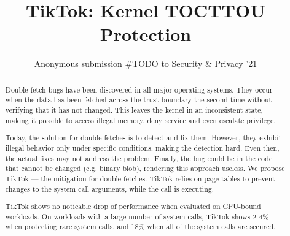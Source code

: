 \documentclass[conference]{IEEEtran}
\newcommand{\sysname}{TikTok}
\newcommand{\roughevaloverheadbad}{18\%}
\newcommand{\roughevaloverheadbetter}{2-4\%}
\begin{document}

\date{}

\title{\Large \bf TikTok: Kernel TOCTTOU Protection}

\author{
Anonymous submission \#TODO to Security & Privacy '21
} %

\maketitle

\begin{abstract}

Double-fetch bugs have been discovered in all major operating systems.
They occur when the data has been fetched across the trust-boundary the second
time without verifying that it has not changed. This leaves the kernel in an
inconsistent state, making it possible to access illegal memory, deny service and
even escalate privilege.

Today, the solution for double-fetches is to detect and fix them. However, they
exhibit illegal behavior only under specific conditions, making the detection
hard. Even then, the actual fixes may not address the problem. Finally, the bug
could be in the code that cannot be changed (e.g. binary blob), rendering this
approach useless. We propose \sysname{} --- the mitigation for double-fetches.
\sysname{} relies on page-tables to prevent changes to the system call arguments,
while the call is executing.

\sysname{} shows no noticable drop of performance when evaluated on CPU-bound
workloads. On workloads with a large number of system calls, \sysname{} shows
\roughevaloverheadbetter{} when protecting rare system calls, and
\roughevaloverheadbad{} when all of the system calls are secured.


\end{abstract}
\end{document}
